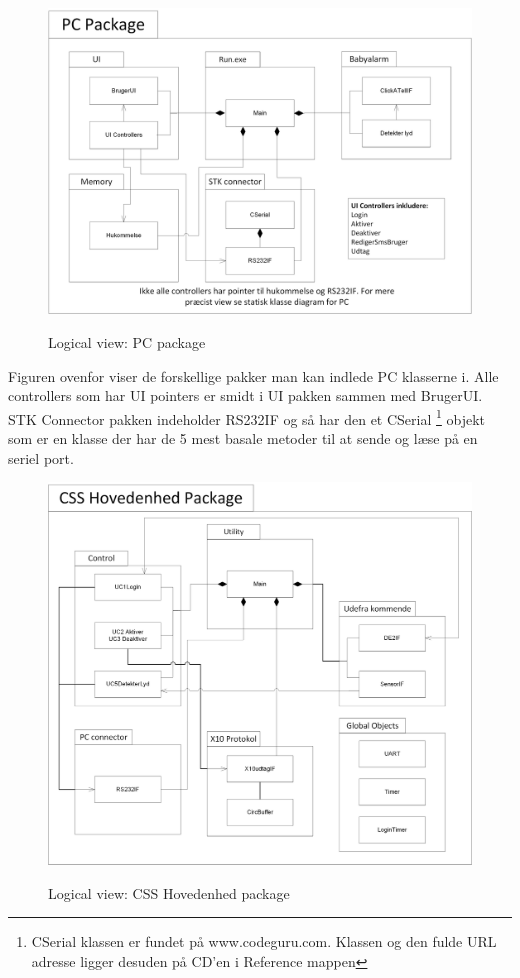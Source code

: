 \begin{figure}[!htb]
     {\includegraphics[width=\textwidth]{billeder/uml/logical_view_pc}}
     \caption{Logical view: PC package}
     \label{fig:PC_package}
\end{figure}

Figuren ovenfor viser de forskellige pakker man kan indlede PC klasserne i. Alle controllers som har UI pointers er smidt i UI pakken sammen med BrugerUI. STK Connector pakken indeholder RS232IF og så har den et CSerial \footnote{CSerial klassen er fundet på www.codeguru.com. Klassen og den fulde URL adresse ligger desuden på CD'en i Reference mappen} objekt som er en klasse der har de 5 mest basale metoder til at sende og læse på en seriel port.


\clearpage

\begin{figure}[!htb]
     {\includegraphics[width=\textwidth]{billeder/uml/logical_view_CSS_Hovedenhed}}
     \caption{Logical view: CSS Hovedenhed package}
     \label{fig:CSS_Hovedenhed_package}
\end{figure}

